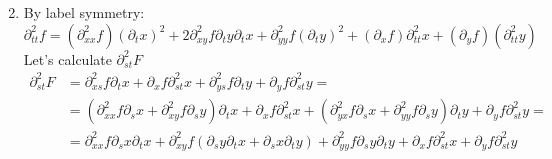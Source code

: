 \documentclass[twoside]{amsart}
\theoremstyle{plain}
\theoremstyle{definition}
\begin{document}
\begin{enumerate}
\[\]
\item By label symmetry:
\[
\partial_{tt}^2 f = (\partial_{xx}^2 f)(\partial_t x)^2 + 2\partial_{xy}^2 f \partial_t y \partial_t x + \partial_{yy}^2 f (\partial_t y)^2 + (\partial_x f) \partial_{tt}^2 x + (\partial_y f)(\partial_{tt}^2 y )
\]
Let's calculate $\partial_{st}^2 F$
\[
\begin{aligned}
  \partial_{st}^2 F & = \partial_{xs}^2 f \partial_t x + \partial_x f \partial_{st}^2 x + \partial_{ys}^2 f \partial_t y + \partial_y f \partial_{st}^2 y = \\
  & = (\partial_{xx}^2 f \partial_s x + \partial_{xy}^2 f \partial_s y) \partial_t x + \partial_x f \partial_{st}^2 x + ( \partial_{yx}^2 f \partial_s x + \partial_{yy}^2 f \partial_s y ) \partial_t y + \partial_y f \partial_{st}^2 y = \\
  & = \partial_{xx}^2 f \partial_s x \partial_t x + \partial_{xy}^2 f ( \partial_s y \partial_t x + \partial_s x \partial_t y) + \partial_{yy}^2 f \partial_s y \partial_t y + \partial_x f \partial_{st}^2 x + \partial_y f \partial_{st}^2 y 
\end{aligned}
\]
\end{enumerate}
\end{document}
